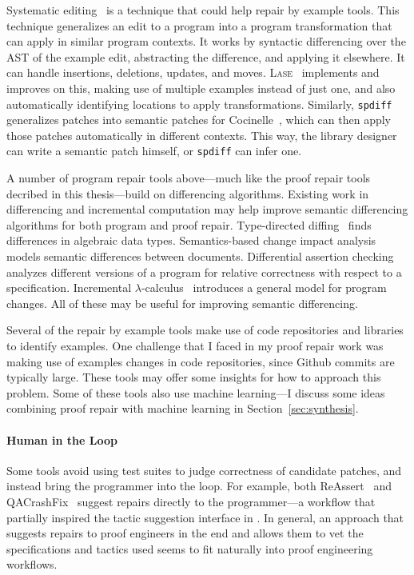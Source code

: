 Systematic editing~\cite{meng2011systematic} is a technique that could help repair by example tools.
This technique generalizes an edit to a program into a program transformation that can apply in similar program contexts.
It works by syntactic differencing over the AST of the example edit, abstracting the difference, and applying it elsewhere.
It can handle insertions, deletions, updates, and moves.
\textsc{Lase}~\cite{meng2013lase} implements and improves on this,
making use of multiple examples instead of just one, %
and also automatically identifying locations to apply transformations.
Similarly, \lstinline{spdiff}~\cite{andersen2010generic} generalizes patches into semantic patches for Cocinelle~\cite{padioleau2008documenting},
which can then apply those patches automatically in different contexts. This way, the library designer can write a semantic patch
himself, or \lstinline{spdiff} can infer one.

A number of program repair tools above---much like the proof repair tools decribed in this thesis---build on differencing algorithms.
Existing work in differencing and incremental computation may help 
improve semantic differencing algorithms for both program and proof repair.
Type-directed diffing~\cite{Miraldo:2017:TDS:3122975.3122976}
finds differences in algebraic data types.
Semantics-based change impact analysis~\cite{Autexier:2010:SCI:1860559.1860580} models semantic differences
between documents.
Differential assertion checking~\cite{differential-assertion-checking-2} analyzes different
versions of a program for relative correctness with respect to a specification.
Incremental $\lambda$-calculus~\cite{Cai:2014:TCH:2594291.2594304} introduces a general model for program changes.
All of these may be useful for improving semantic differencing.

Several of the repair by example tools make use of code repositories and libraries to identify examples.
One challenge that I faced in my proof repair work was making use of examples changes in code repositories, since Github commits are typically large.
These tools may offer some insights for how to approach this problem.
Some of these tools also use machine learning---I discuss some ideas combining proof repair
with machine learning in Section~\ref{sec:synthesis}.

\paragraph{Human in the Loop}
Some tools avoid using test suites to judge correctness of candidate patches, and instead
bring the programmer into the loop. For example, both ReAssert~\cite{daniel2009reassert}
and QACrashFix~\cite{gao2015fixing} suggest repairs directly to the programmer---a workflow
that partially inspired the tactic suggestion interface in \toolnamec.
In general, an approach that suggests repairs to proof engineers in the end
and allows them to vet the specifications and tactics used seems to fit naturally into proof engineering workflows. 

